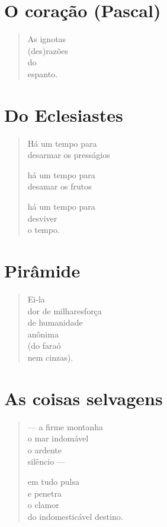 \chapter{O coração (Pascal)}

\begin{verse}
As ignotas\\
(des)razões\\
do\\
espanto.
\end{verse}

\chapter{Do Eclesiastes}

\begin{verse}
Há um tempo para\\
desarmar os presságios

há um tempo para\\
desamar os frutos

há um tempo para\\
desviver\\
o tempo.
\end{verse}

\chapter{Pirâmide}

\begin{verse}
Ei-la\\
dor de milhares\qquad força\\
de humanidade\\
anônima\\
(do faraó\\
nem cinzas).
\end{verse}

\chapter{As coisas selvagens}

\begin{verse}
--- a firme montanha\\
\quad o mar indomável\\
\quad o ardente\\
\quad silêncio ---

em tudo pulsa\\
e penetra\\
o clamor\\
do indomesticável destino.
\end{verse}

